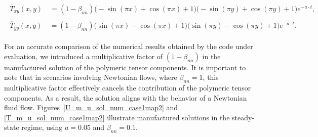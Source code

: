 \documentclass[preprint, 12pt]{elsarticle}
\begin{document}
\begin{gather}
    \begin{aligned}
        \overline{T}_{xy}(x,y) &~= (1-\beta_{nn})\bigg(-\sin(\pi x)+\cos (\pi x)+1\bigg)\bigg(-\sin (\pi  y)+\cos (\pi  y)+1\bigg)e^{-a\cdot t},\label{eq:txy_case0_2}
    \end{aligned}
\end{gather}
\begin{gather}
    \begin{aligned}
        \overline{T}_{yy}(x,y) &~= (1-\beta_{nn})\bigg(\sin(\pi x)-\cos(\pi  x)+1\bigg)\bigg(\sin(\pi y)-\cos(\pi y)+1\bigg)e^{-a\cdot t}.\label{eq:tyy_case0_2}
    \end{aligned}
\end{gather}

For an accurate comparison of the numerical results obtained by the code under evaluation, we introduced a multiplicative factor of $(1-\beta_{nn})$ in the manufactured solution of the polymeric tensor components. It is important to note that in scenarios involving Newtonian flows, where $\beta_{nn} = 1$, this multiplicative factor effectively cancels the contribution of the polymeric tensor components. As a result, the solution aligns with the behavior of a Newtonian fluid flow. Figures~\ref{U_m_u_sol_num_case1map2} and \ref{T_m_u_sol_num_case1map2} illustrate manufactured solutions in the steady-state regime, using $a = 0.05$ and $\beta_{nn}=0.1$.
\end{document}
